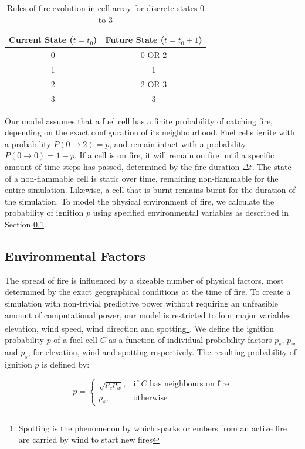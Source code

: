 \begin{table}[h!]
    \centering
    \begin{tabular}{|c|c|}
    \hline
     \textbf{Current State ($t=t_0$)} & \textbf{Future State ($t=t_0+1$)}\\ \hline
     0 & 0 OR 2\\ \hline
     1 & 1\\ \hline
     2 & 2 OR 3\\ \hline
     3 & 3\\ \hline
    \end{tabular}
    \caption{Rules of fire evolution in cell array for discrete states 0 to 3}
    \label{table:futurestate}
\end{table}

\noindent Our model assumes that a fuel cell has a finite probability of catching fire, depending on the exact configuration of its neighbourhood. Fuel cells ignite with a probability $P(0\xrightarrow{}2)=p$, and remain intact with a probability $P(0\xrightarrow{}0) = 1- p$. If a cell is on fire, it will remain on fire until a specific amount of time steps has passed, determined by the fire duration $\Delta t$. The state of a non-flammable cell is static over time, remaining non-flammable for the entire simulation. Likewise, a cell that is burnt remains burnt for the duration of the simulation. To model the physical environment of fire, we calculate the probability of ignition $p$ using specified environmental variables as described in Section \ref{factors}.
\subsection{Environmental Factors}\label{factors}
The spread of fire is influenced by a sizeable number of physical factors, most determined by the exact geographical conditions at the time of fire. To create a simulation with non-trivial predictive power without requiring an unfeasible amount of computational power, our model is restricted to four major variables: elevation, wind speed, wind direction and spotting\footnote{Spotting is the phenomenon by which sparks or embers from an active fire are carried by wind to start new fires}. We define the ignition probability $p$ of a fuel cell $C$ as a function of individual probability factors $p_e$, $p_w$ and $p_s$, for elevation, wind and spotting respectively. The resulting probability of ignition $p$ is defined by:

\begin{equation}\label{netp}
    p = \begin{cases} \sqrt{p_e p_w}, & \mbox{if } C \mbox{ has neighbours on fire} \\ p_s, & \mbox{otherwise}
     \end{cases}
\end{equation}

